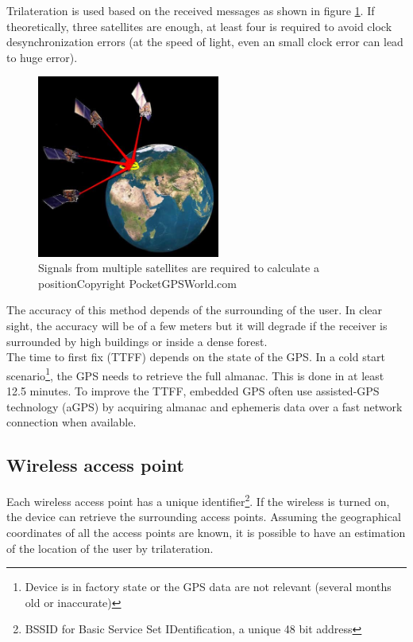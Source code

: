 Trilateration is used based on the received messages as shown in figure \ref{fig:gps-earth}.
If theoretically, three satellites are enough, at least four is required to avoid clock desynchronization errors (at the speed of light, even an small clock error can lead to huge error).\\

\begin{figure}[h]
  \centering
  \includegraphics[width=6cm]{images/gps.jpg}
  \caption{Signals from multiple satellites are required to calculate a position\newline Copyright PocketGPSWorld.com}
  \label{fig:gps-earth}
\end{figure}


The accuracy of this method depends of the surrounding of the user.
In clear sight, the accuracy will be of a few meters but it will degrade if the receiver is surrounded by high buildings or inside a dense forest.\\

The time to first fix (TTFF) depends on the state of the GPS.
In a cold start scenario\footnote{Device is in factory state or the GPS data are not relevant (several months old or inaccurate)}, the GPS needs to retrieve the full almanac.
This is done in at least 12.5 minutes\cite{gpsuser}.
To improve the TTFF, embedded GPS often use assisted-GPS technology (aGPS) by acquiring almanac and ephemeris data over a fast network connection when available.

\subsection{Wireless access point}
Each wireless access point has a unique identifier\footnote{BSSID for Basic Service Set IDentification, a unique 48 bit address}.
If the wireless is turned on, the device can retrieve the surrounding access points.
Assuming the geographical coordinates of all the access points are known, it is possible to have an estimation of the location of the user by trilateration.\\

